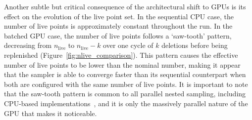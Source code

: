 \documentclass[fleqn,usenatbib]{mnras}
\begin{document}


Another subtle but critical consequence of the architectural shift to GPUs is
its effect on the evolution of the live point set. In the sequential
CPU case, the number of live points is approximately constant throughout the run. In the
batched GPU case, the number of live points follows a `saw-tooth'
pattern, decreasing from $n_{\text{live}}$ to
\mbox{$n_{\text{live}} - k$} over one cycle of $k$ deletions before being replenished (Figure~\ref{fig:nlive_comparison}). This pattern
causes the effective number of live points to be lower than the nominal number,
making it appear that the sampler is able to converge faster than its sequential counterpart
when both are configured with the same number of live points. It is important to 
note that the saw-tooth pattern is common to all
parallel nested sampling, including CPU-based implementations~\citep{Handley:2015vkr},
and it is only the massively parallel nature of the GPU that makes it noticeable.
\end{document}
